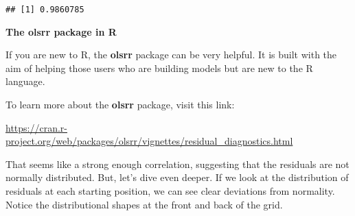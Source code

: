 \documentclass[
]{book}
\begin{document}
\begin{verbatim}
## [1] 0.9860785
\end{verbatim}

\begin{blackbox}

\begin{center}
\textbf{The olsrr package in R}

\end{center}

If you are new to R, the \textbf{olsrr} package can be very helpful. It is built with the aim of helping those users who are building models but are new to the R language.

To learn more about the \textbf{olsrr} package, visit this link:

\url{https://cran.r-project.org/web/packages/olsrr/vignettes/residual_diagnostics.html}

\end{blackbox}

That seems like a strong enough correlation, suggesting that the residuals are not normally distributed. But, let's dive even deeper. If we look at the distribution of residuals at each starting position, we can see clear deviations from normality. Notice the distributional shapes at the front and back of the grid.
\end{document}
